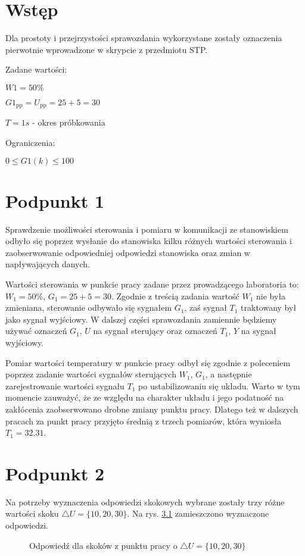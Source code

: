 \chapter{Wstęp}
Dla prostoty i przejrzystości sprawozdania wykorzystane zostały oznaczenia pierwotnie wprowadzone w skrypcie z przedmiotu STP.

Zadane wartości:

$W1=50\%$

$G1_{\mathrm{pp}}=U_{\mathrm{pp}}=25+5=30$

$T=1s$ - okres próbkowania

Ograniczenia:

$0 \le G1(k) \le 100$

\chapter{Podpunkt 1}
Sprawdzenie możliwości sterowania i pomiaru w komunikacji ze stanowiskiem odbyło się poprzez wysłanie do stanowiska kilku różnych wartości sterowania i zaobserwowanie odpowiedniej odpowiedzi stanowiska oraz zmian w napływających danych.

Wartości sterowania w punkcie pracy zadane przez prowadzącego laboratoria to: $W_1=50\%$, $G_1=25+5=30$. Zgodnie z treścią zadania wartość $W_1$ nie była zmieniana, sterowanie odbywało się sygnałem $G_1$, zaś sygnał $T_1$ traktowany był jako sygnał wyjściowy. W dalszej części sprawozdania zamiennie będziemy używać oznaczeń $G_1$, $U$ na sygnał sterujący oraz oznaczeń $T_1$, $Y$ na sygnał wyjściowy.

Pomiar wartości temperatury w punkcie pracy odbył się zgodnie z poleceniem poprzez zadanie wartości sygnałów sterujących $W_1$, $G_1$, a następnie zarejestrowanie wartości sygnału $T_1$ po ustabilizowaniu się układu. Warto w tym momencie zauważyć, że ze względu na charakter układu i jego podatność na zakłócenia zaobserwowano drobne zmiany punktu pracy. Dlatego też w dalszych pracach za punkt pracy przyjęto średnią z trzech pomiarów, która wyniosła $T_1=\num{32,31}$.


\chapter{Podpunkt 2}
Na potrzeby wyznaczenia odpowiedzi skokowych wybrane zostały trzy różne wartości skoku $\triangle U = \{10, 20, 30\}$. Na rys. \ref{R1} zamieszczono wyznaczone odpowiedzi.

\begin{figure}[ht]
\centering

\caption{Odpowiedź dla skoków z punktu pracy o $\triangle U = \{10, 20, 30\}$}
\label{R1}
\end{figure}

